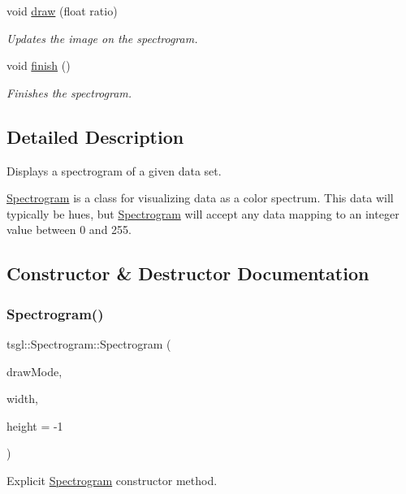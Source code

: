 \begin{DoxyCompactItemize}
void \hyperlink{classtsgl_1_1_spectrogram_aef15257f0daa13a57d99cd621d402bd5}{draw} (float ratio)
\begin{DoxyCompactList}\small\item\em Updates the image on the spectrogram. \end{DoxyCompactList}\item 
void \hyperlink{classtsgl_1_1_spectrogram_a9e6eb0489ee0fb9f96b2a5202868a1c2}{finish} ()
\begin{DoxyCompactList}\small\item\em Finishes the spectrogram. \end{DoxyCompactList}\end{DoxyCompactItemize}


\subsection{Detailed Description}
Displays a spectrogram of a given data set. 

\hyperlink{classtsgl_1_1_spectrogram}{Spectrogram} is a class for visualizing data as a color spectrum. This data will typically be hues, but \hyperlink{classtsgl_1_1_spectrogram}{Spectrogram} will accept any data mapping to an integer value between 0 and 255. 

\subsection{Constructor \& Destructor Documentation}
\mbox{\label{classtsgl_1_1_spectrogram_a806d3244b086b9ed2c982b7178eb5139}} 
\subsubsection{\texorpdfstring{Spectrogram()}{Spectrogram()}}
{\footnotesize\ttfamily tsgl\+::\+Spectrogram\+::\+Spectrogram (\begin{DoxyParamCaption}\item[{Spectrogram\+Drawmode}]{draw\+Mode,  }\item[{int}]{width,  }\item[{int}]{height = {\ttfamily -\/1} }\end{DoxyParamCaption})}



Explicit \hyperlink{classtsgl_1_1_spectrogram}{Spectrogram} constructor method. 

